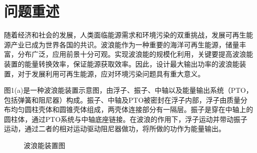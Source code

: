 \documentclass{article}
\numberwithin{equation}{subsection}
\begin{document}
\newpage





{\centering\section{问题重述}}
随着经济和社会的发展，人类面临能源需求和环境污染的双重挑战，发展可再生能源产业已成为世界各国的共识。波浪能作为一种重要的海洋可再生能源，储量丰富，分布广泛，应用前景十分可观。实现波浪能的规模化利用，关键要提高波浪能装置的能量转换效率，保证能源获取效率。因此，设计最大输出功率的波浪能装置，对于发展利用可再生能源，应对环境污染问题具有重大意义。

图1(a)是一种波浪能装置示意图，由浮子、振子、中轴以及能量输出系统（PTO，包括弹簧和阻尼器）构成。振子、中轴及PTO被密封在浮子内部，浮子由质量分布均匀圆柱壳体和圆锥壳体组成，两壳体连接部分有一隔层。振子是穿在中轴上的圆柱体，通过PTO系统与中轴底座链接。在波浪的作用下，浮子运动并带动振子运动，通过二者的相对运动驱动阻尼器做功，将所做的功作为能量输出。

\begin{figure}[htbp]
    \centering
    \quad
    \caption{波浪能装置图}
\end{figure}
\end{document}
